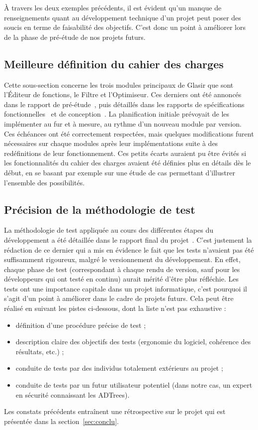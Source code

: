 À travers les deux exemples précédents, il est évident qu'un manque de renseignements quant au développement technique d'un projet peut poser des soucis en terme de faisabilité des objectifs. C'est donc un point à améliorer lors de la phase de pré-étude de nos projets futurs.

\subsection{Meilleure définition du cahier des charges}
\label{ssec:cahier-charges}

Cette sous-section concerne les trois modules principaux de Glasir que sont l'Éditeur de fonctions, le Filtre et l'Optimiseur. Ces derniers ont été annoncés dans le rapport de pré-étude~\cite{pre_etude}, puis détaillés dans les rapports de spécifications fonctionnelles~\cite{spec_fonc} et de conception~\cite{conception}. La planification initiale prévoyait de les implémenter au fur et à mesure, au rythme d'un nouveau module par version. Ces échéances ont été correctement respectées, mais quelques modifications furent nécessaires sur chaque modules après leur implémentations suite à des redéfinitions de leur fonctionnement. Ces petits écarts auraient pu être évités si les fonctionnalités du cahier des charges avaient été définies plus en détails dès le début, en se basant par exemple sur une étude de cas permettant d'illustrer l'ensemble des possibilités.

\subsection{Précision de la méthodologie de test}
\label{ssec:methodoTest}

La méthodologie de test appliquée au cours des différentes étapes du développement a été détaillée dans le rapport final du projet~\cite{rapportFinal}. C'est justement la rédaction de ce dernier qui a mis en évidence le fait que les tests n'avaient pas été suffisamment rigoureux, malgré le versionnement du développement. En effet, chaque phase de test (correspondant à chaque rendu de version, sauf pour les développeurs qui ont testé en continu) aurait mérité d'être plus réfléchie. Les tests ont une importance capitale dans un projet informatique, c'est pourquoi il s'agit d'un point à améliorer dans le cadre de projets futurs. Cela peut être réalisé en suivant les pistes ci-dessous, dont la liste n'est pas exhaustive : 

\begin{itemize}
\item définition d'une procédure précise de test ;
\item description claire des objectifs des tests (ergonomie du logiciel, cohérence des résultats, etc.) ;
\item conduite de tests par des individus totalement extérieurs au projet ;
\item conduite de tests par un futur utilisateur potentiel (dans notre cas, un expert en sécurité connaissant les ADTrees).
\end{itemize}

Les constats précédents entraînent une rétrospective sur le projet qui est présentée dans la {\sc section}~\ref{sec:conclu}.

